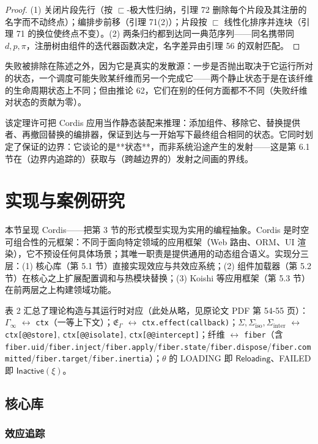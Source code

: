 \documentclass[11pt,a4paper]{article}
\theoremstyle{plain}
\theoremstyle{definition}
\theoremstyle{remark}
\begin{document}
\begin{proof}
(1) 关闭片段先行（按 $\sqsubset$-极大性归纳，引理 72 删除每个片段及其注册的名字而不动终点）；编排步前移（引理 71(2)）；片段按 $\sqsubset$ 线性化排序并连块（引理 71 的换位使终点不变）。(2) 两条归约都到达同一典范序列——同名携带同 $d, p, \pi$，注册树由组件的迭代器函数决定，名字差异由引理 56 的双射匹配。
\end{proof}

失败被排除在陈述之外，因为它是真实的发散源：一步是否抛出取决于它运行所对的状态，一个调度可能失败某纤维而另一个完成它——两个静止状态于是在该纤维的生命周期状态上不同；但由推论 62，它们在别的任何方面都不不同（失败纤维对状态的贡献为零）。

该定理许可把 Cordis 应用当作静态装配来推理：添加组件、移除它、替换提供者、再撤回替换的编排器，保证到达与一开始写下最终组合相同的状态。它同时划定了保证的边界：它谈论的是**状态**，而非系统沿途产生的发射——这是第 6.1 节在（边界内追踪的）获取与（跨越边界的）发射之间画的界线。
\section{实现与案例研究}

本节呈现 Cordis——把第 3 节的形式模型实现为实用的编程抽象。Cordis 是时空可组合性的元框架：不同于面向特定领域的应用框架（Web 路由、ORM、UI 渲染），它不预设任何具体场景；其唯一职责是提供通用的动态组合语义。实现分三层：(1) 核心库（第 5.1 节）直接实现效应与共效应系统；(2) 组件加载器（第 5.2 节）在核心之上扩展配置调和与热模块替换；(3) Koishi 等应用框架（第 5.3 节）在前两层之上构建领域功能。

表 2 汇总了理论构造与其运行时对应（此处从略，见原论文 PDF 第 54-55 页）：$\Gamma_\infty$ $\leftrightarrow$ \texttt{ctx}（一等上下文）；$\mathfrak{E}_\Gamma$ $\leftrightarrow$ \texttt{ctx.effect(callback)}；$\Sigma, \Sigma_{\mathrm{iso}}, \Sigma_{\mathrm{inter}}$ $\leftrightarrow$ \texttt{ctx[@@store]}, \texttt{ctx[@@isolate]}, \texttt{ctx[@@intercept]}；纤维 $\leftrightarrow$ \texttt{fiber}（含 \texttt{fiber.uid}/\texttt{fiber.inject}/\texttt{fiber.apply}/\texttt{fiber.state}/\texttt{fiber.dispose}/\texttt{fiber.committed}/\texttt{fiber.target}/\texttt{fiber.inertia}）；$\theta$ 的 LOADING 即 $\mathsf{Reloading}$、FAILED 即 $\mathsf{Inactive}(\xi)$。

\subsection{核心库}

\subsubsection{效应追踪}
\end{document}
